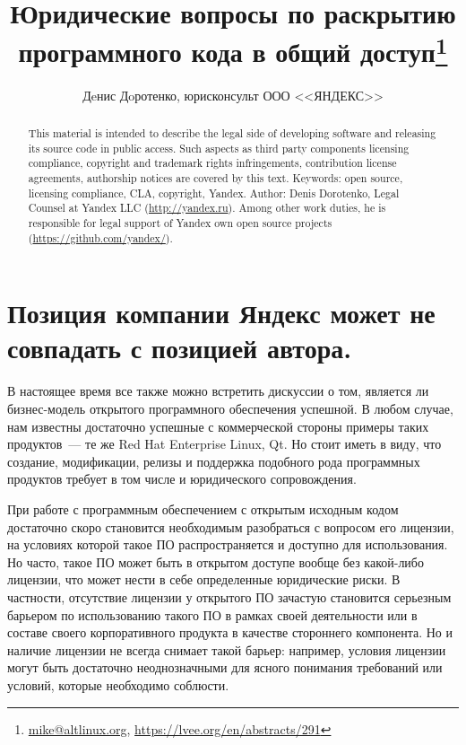 \documentclass[10pt, a5paper]{article}
\begin{document}
\title{Юридические вопросы по раскрытию  программного кода в общий доступ\footnote{\url{mike@altlinux.org}, \url{https://lvee.org/en/abstracts/291}}}
\author{Дeнис Дoротенко, юрисконсульт ООО <<ЯНДЕКС>>}
\maketitle
\begin{abstract}
This material is intended to describe the legal side of developing software and releasing its source code in public access. Such aspects as third party components licensing compliance, copyright and trademark rights infringements, contribution license agreements, authorship notices are covered by this text.
Keywords: open source, licensing compliance, CLA, copyright, Yandex.
Author: Denis Dorotenko, Legal Counsel at Yandex LLC (\url{http://yandex.ru}). Among other work duties, he is responsible for legal support of Yandex own open source projects (\url{https://github.com/yandex/}).
\end{abstract}

\section*{Позиция компании Яндекс может не совпадать с позицией автора.}

В настоящее время все также можно встретить дискуссии о том, является ли бизнес-модель открытого программного обеспечения успешной.  В любом случае, нам известны достаточно успешные с коммерческой стороны примеры таких продуктов~--- те же Red Hat Enterprise Linux, Qt. Но стоит иметь в виду, что создание, модификации, релизы и поддержка подобного рода программных продуктов требует в том числе и юридического сопровождения.

При работе с программным обеспечением с открытым исходным кодом достаточно скоро становится необходимым разобраться с вопросом его лицензии, на условиях которой такое ПО распространяется и доступно для использования. Но часто, такое ПО может быть в открытом доступе вообще без какой-либо лицензии, что может нести в себе определенные юридические риски. В частности, отсутствие лицензии у открытого ПО зачастую становится серьезным барьером по использованию такого ПО в рамках своей деятельности или в составе своего корпоративного продукта в качестве стороннего компонента. Но и наличие лицензии не всегда снимает такой барьер: например, условия лицензии могут быть достаточно неоднозначными для ясного понимания требований или условий, которые необходимо соблюсти. 
\end{document}
